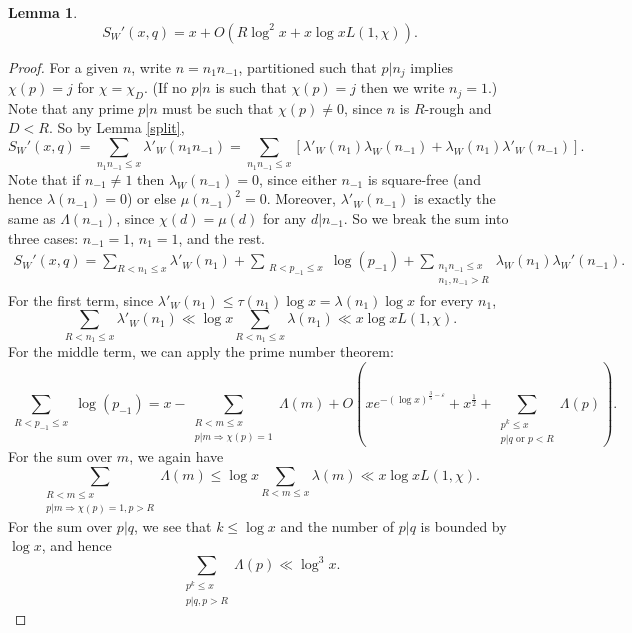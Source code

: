 \documentclass{amsart}
\newtheorem{lemma}[theorem]{Lemma}
\begin{document}
\begin{lemma}\label{SWx}
$$S_W'(x,q)=x+O\left(R\log^2 x+x\log xL(1,\chi)\right).$$
\end{lemma}
\begin{proof}
For a given $n$, write $n=n_1n_{-1}$, partitioned such that $p|n_j$ implies $\chi(p)=j$ for $\chi=\chi_D$.  (If no $p|n$ is such that $\chi(p)=j$ then we write $n_j=1$.)  Note that any prime $p|n$ must be such that $\chi(p)\neq 0$, since $n$ is $R$-rough and $D<R$.  So by Lemma \ref{split},
$$S_W'(x,q)=\sum_{n_1n_{-1}\leq x}\lambda'_W\left(n_1n_{-1}\right)=\sum_{n_1n_{-1}\leq x}\left[\lambda'_W\left(n_1\right)\lambda_W\left(n_{-1}\right)+\lambda_W\left(n_1\right) \lambda'_W\left(n_{-1}\right)\right].$$
Note that if $n_{-1}\neq 1$ then $\lambda_W\left(n_{-1}\right)=0$, since either $n_{-1}$ is square-free (and hence $\lambda\left(n_{-1}\right)=0$) or else $\mu(n_{-1})^2=0$.  Moreover, $\lambda'_W\left(n_{-1}\right)$ is exactly the same as $\Lambda\left(n_{-1}\right)$, since $\chi(d)=\mu(d)$ for any $d|n_{-1}$. So we break the sum into three cases: $n_{-1}=1$, $n_1=1$, and the rest.
\begin{gather}\label{DWLambda}
S_W'(x,q)=\sum_{R<n_1\leq x}\lambda'_W\left(n_1\right)+\sum_{\substack{R<p_{-1}\leq x }}\log\left(p_{-1}\right)+\sum_{\substack{n_1n_{-1}\leq x \\ n_1,n_{-1}>R }}\lambda_W\left(n_1\right) \lambda_W'\left(n_{-1}\right).
\end{gather}
For the first term, since $\lambda'_W\left(n_{1}\right)\leq \tau\left(n_1\right)\log x=\lambda\left(n_1\right)\log x$ for every $n_1$,
$$\sum_{R<n_1\leq x}\lambda'_W\left(n_1\right)\ll \log x\sum_{R<n_1\leq x}\lambda\left(n_1\right)\ll x\log xL(1,\chi).$$
For the middle term, we can apply the prime number theorem:
$$\sum_{\substack{R<p_{-1}\leq x }}\log\left(p_{-1}\right)=x-\sum_{\substack{R<m\leq x \\ p|m\Rightarrow \chi(p)=1}}\Lambda(m)+O\left(xe^{-(\log x)^{\frac 35-\varepsilon}}+x^\frac 12+\sum_{\substack{p^k\leq x\\ p|q\mbox{ or }p<R }}\Lambda(p)\right).$$
For the sum over $m$, we again have
$$\sum_{\substack{R<m\leq x \\ p|m\Rightarrow \chi(p)=1,p>R}}\Lambda(m)\leq \log x\sum_{R<m\leq x}\lambda(m)\ll x\log xL(1,\chi).$$
For the sum over $p|q$, we see that $k\leq \log x$ and the number of $p|q$ is bounded by $\log x$, and hence
$$\sum_{\substack{p^k\leq x \\ p|q,p>R}}\Lambda(p)\ll \log^3 x.$$

\end{proof}
\end{document}
